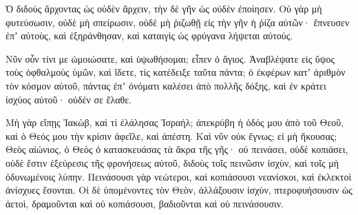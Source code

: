 {Ὁ διδοὺς ἄρχοντας ὡς οὐδὲν ἄρχειν, τὴν δὲ γῆν ὡς οὐδὲν ἐποίησεν.
Οὐ γὰρ μὴ φυτεύσωσιν, οὐδὲ μὴ σπείρωσιν, οὐδὲ μὴ ῥιζωθῇ εἰς τὴν γῆν ἡ ῥίζα αὐτῶν· ἔπνευσεν ἐπʼ αὐτοὺς, καὶ ἐξηράνθησαν, καὶ καταιγὶς ὡς φρύγανα λήψεται αὐτούς.
\par }{\PP {}Νῦν οὖν τίνι με ὡμοιώσατε, καὶ ὑψωθήσομαι; εἶπεν ὁ ἅγιος.
Ἀναβλέψατε εἰς ὕψος τοὺς ὀφθαλμοὺς ὑμῶν, καὶ ἴδετε, τίς κατέδειξε ταῦτα πάντα; ὁ ἐκφέρων κατʼ ἀριθμὸν τὸν κόσμον αὐτοῦ, πάντας ἐπʼ ὀνόματι καλέσει ἀπὸ πολλῆς δόξης, καὶ ἐν κράτει ἰσχύος αὐτοῦ· οὐδέν σε ἔλαθε.
\par }{\PP {}Μὴ γὰρ εἴπῃς Ἰακὼβ, καὶ τί ἐλάλησας Ἰσραήλ; ἀπεκρύβη ἡ ὁδός μου ἀπὸ τοῦ Θεοῦ, καὶ ὁ Θεός μου τὴν κρίσιν ἀφεῖλε, καὶ ἀπέστη.
Καὶ νῦν οὐκ ἔγνως; εἰ μὴ ἤκουσας; Θεὸς αἰώνιος, ὁ Θεὸς ὁ κατασκευάσας τὰ ἄκρα τῆς γῆς· οὐ πεινάσει, οὐδὲ κοπιάσει, οὐδὲ ἔστιν ἐξεύρεσις τῆς φρονήσεως αὐτοῦ,
διδοὺς τοῖς πεινῶσιν ἰσχὺν, καὶ τοῖς μὴ ὀδυνωμένοις λύπην.
Πεινάσουσι γὰρ νεώτεροι, καὶ κοπιάσουσι νεανίσκοι, καὶ ἐκλεκτοὶ ἀνίσχυες ἔσονται.
Οἱ δὲ ὑπομένοντες τὸν Θεὸν, ἀλλάξουσιν ἰσχὺν, πτεροφυήσουσιν ὡς ἀετοὶ, δραμοῦνται καὶ οὐ κοπιάσουσι, βαδιοῦνται καὶ οὐ πεινάσουσιν.

}
